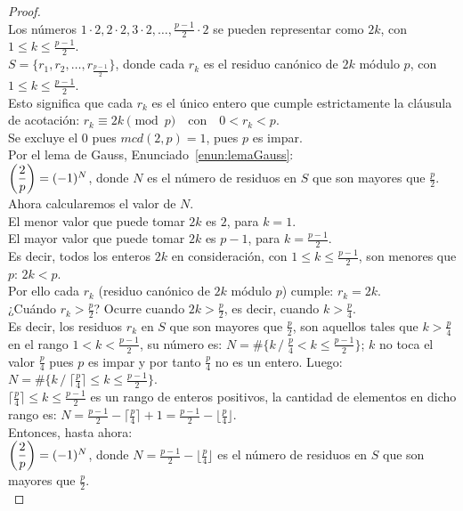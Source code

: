 \begin{proof} \, \\
Los números $1\cdot2, 2\cdot2, 3\cdot2, \dots, \frac{p-1}{2}\cdot2$ se pueden representar como $2k$, con $1 \leq k \leq \frac{p-1}{2}$. \\
$S = \{ r_1, r_2, \dots, r_{\frac{p-1}{2}} \}$, donde cada $r_k$ es el residuo canónico de $2k$ módulo $p$, con $1 \leq k \leq \tfrac{p-1}{2}$. \\
Esto significa que cada $r_k$ es el único entero que cumple estrictamente la cláusula de acotación: $r_k \equiv 2k \pmod p \quad \text{con} \quad 0 < r_k < p$. \\ 
Se excluye el $0$ pues $mcd(2,p)=1$, pues $p$ es impar. \\
Por el lema de Gauss, Enunciado~\ref{enun:lemaGauss}: \\
$\left(\dfrac{2}{p}\right) = (-1)^{N}$, donde $N$ es el número de residuos en $S$ que son mayores que $\frac{p}{2}$. \\
Ahora calcularemos el valor de $N$. \\
El menor valor que puede tomar $2k$ es $2$, para $k=1$. \\
El mayor valor que puede tomar $2k$ es $p-1$, para $k=\frac{p-1}{2}$. \\
Es decir, todos los enteros $2k$ en consideración, con $1 \leq k \leq \frac{p-1}{2}$, son menores que $p$: $2k < p$. \\
Por ello cada $r_k$ (residuo canónico de $2k$ módulo $p$) cumple: $r_k = 2k$. \\
¿Cuándo $r_k > \frac{p}{2}$?
Ocurre cuando $2k > \frac{p}{2}$, es decir, cuando $k > \frac{p}{4}$. \\
Es decir, los residuos $r_k$ en $S$ que son mayores que $\frac{p}{2}$, son aquellos tales que $k > \frac{p}{4}$ en el rango $1 < k < \frac{p-1}{2}$, su número es: $N = \#\{ k \, / \; \frac{p}{4} < k \leq \frac{p-1}{2} \}$; $k$ no toca el valor $\frac{p}{4}$ pues $p$ es impar y por tanto $\frac{p}{4}$ no es un entero. Luego: $N = \#\{ k \, / \; \lceil\frac{p}{4}\rceil \leq k \leq \frac{p-1}{2} \}$. \\
$\lceil\frac{p}{4}\rceil \leq k \leq \frac{p-1}{2}$ es un rango de enteros positivos, la cantidad de elementos en dicho rango es:  
$N = \frac{p-1}{2} - \lceil \frac{p}{4} \rceil + 1 = \frac{p-1}{2} - \lfloor\frac{p}{4}\rfloor$. \\
Entonces, hasta ahora: \\
$\left(\dfrac{2}{p}\right) = (-1)^{N}$, donde $N=\frac{p-1}{2} - \lfloor\frac{p}{4}\rfloor$ es el número de residuos en $S$ que son mayores que $\frac{p}{2}$.\\

\end{proof}
